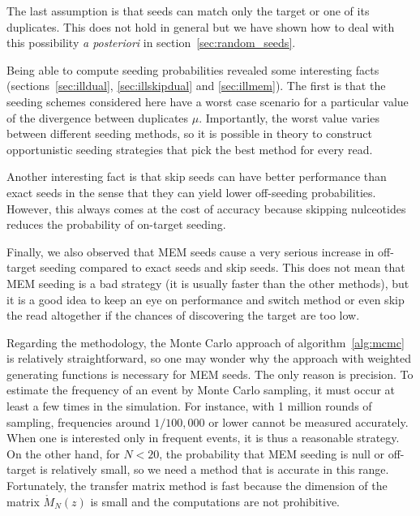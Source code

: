 \documentclass{article}
\begin{document}
The last assumption is that seeds can match only the target or one of its
duplicates. This does not hold in general but we have shown how to deal
with this possibility \textit{a posteriori} in
section~\ref{sec:random_seeds}.

Being able to compute seeding probabilities revealed some interesting
facts (sections~\ref{sec:illdual}, \ref{sec:illskipdual} and
\ref{sec:illmem}). The first is that the seeding schemes considered here
have a worst case scenario for a particular value of the divergence
between duplicates $\mu$. Importantly, the worst value varies between
different seeding methods, so it is possible in theory to construct
opportunistic seeding strategies that pick the best method for every read.

Another interesting fact is that skip seeds can have better performance
than exact seeds in the sense that they can yield lower off-seeding
probabilities. However, this always comes at the cost of accuracy because
skipping nulceotides reduces the probability of on-target seeding.

Finally, we also observed that MEM seeds cause a very serious increase in
off-target seeding compared to exact seeds and skip seeds. This does not
mean that MEM seeding is a bad strategy (it is usually faster than the
other methods), but it is a good idea to keep an eye on performance and
switch method or even skip the read altogether if the chances of
discovering the target are too low.

Regarding the methodology, the Monte Carlo approach of
algorithm~\ref{alg:mcmc} is relatively straightforward, so one may wonder
why the approach with weighted generating functions is necessary for MEM
seeds. The only reason is precision. To estimate the frequency of an event
by Monte Carlo sampling, it must occur at least a few times in the
simulation. For instance, with 1 million rounds of sampling, frequencies
around $1/100,000$ or lower cannot be measured accurately. When one is
interested only in frequent events, it is thus a reasonable strategy. On
the other hand, for $N < 20$, the probability that MEM seeding is null or
off-target is relatively small, so we need a method that is accurate in
this range. Fortunately, the transfer matrix method is fast because the
dimension of the matrix $\mathring{M}_N(z)$ is small and the computations
are not prohibitive.
\end{document}
